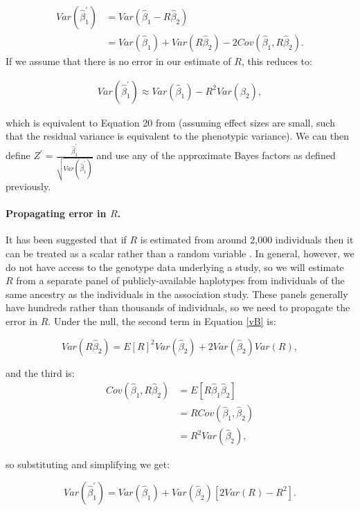 \documentclass[11pt,titlepage]{article}
\begin{document}
\begin{align}
Var(\hat \beta_1^{\prime}) &= Var( \hat \beta_1 - R \hat \beta_2)\\
&= Var(\hat \beta_1) + Var(R \hat \beta_2) - 2 Cov (\hat \beta_1, R \hat \beta_2) \label{vB}.
\end{align}
If we assume that there is no error in our estimate of $R$, this reduces to:

\begin{align}
Var(\hat \beta_1^{\prime}) \approx Var(\hat \beta_1) - R^2 Var( \hat \beta_2),
\end{align}

\noindent which is equivalent to Equation 20 from \citet{Yang:2012uq} (assuming effect sizes are small, such that the residual variance is equivalent to the phenotypic variance). We can then define $Z^{\prime} = \frac{\hat \beta_1^{\prime}}{\sqrt{ Var(\hat \beta_1^{\prime})}}$ and use any of the approximate Bayes factors as defined previously. 

\paragraph{Propagating error in $R$.} It has been suggested that if $R$ is estimated from around 2,000 individuals then it can be treated as a scalar rather than a random variable \citep{Yang:2012uq}. In general, however, we do not have access to the genotype data underlying a study, so we will estimate $R$ from a separate panel of publicly-available haplotypes from individuals of the same ancestry as the individuals in the association study. These panels generally have hundreds rather than thousands of individuals, so we need to propagate the error in $R$. Under the null, the second term in Equation \ref{vB} is:

\begin{equation}
Var(R \hat \beta_2) = E[R]^2 Var( \hat \beta_2) + 2 Var(\hat \beta_2) Var(R),
\end{equation}

\noindent and the third is:
\begin{align}
Cov (\hat \beta_1, R \hat \beta_2) &= E[ R  \hat \beta_1 \hat \beta_2]\\
& = R Cov (\hat \beta_1, \hat \beta_2)\\
& = R^2 Var(\hat \beta_2),
\end{align}

\noindent so substituting and simplifying we get:

\begin{equation} \label{varB}
Var(\hat \beta_1^{\prime}) = Var(\hat \beta_1) + Var(\hat \beta_2) [2 Var(R)- R^2].
\end{equation}
\end{document}

